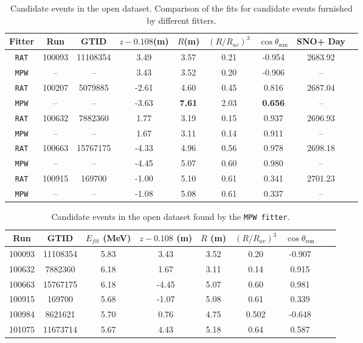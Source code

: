 \begin{table}[ht]
	\centering
	\caption[Candidate events in the open dataset.]{Candidate events in the open dataset. Comparison of the fits for candidate events furnished by different fitters.	\label{tab:opendataCompare}}
	\begin{tabular*}{150mm}{c@{\extracolsep{\fill}}cccccccc}
		\toprule
		Fitter &	Run &  GTID &  $z-0.108$(m) & $R$(m)& $(R/R_{av})^3$ & $\cos\theta_\mathrm{sun}$ & SNO+ Day\\
		\hline 
		\texttt{RAT} & 100093 &11108354 &3.49 &3.57 &0.21 &-0.954 &2683.92 \\	
		\texttt{MPW} &  --& --& 3.43 &	3.52 &	0.20	& -0.906 & --\\
		\texttt{RAT} &	100207 &5079885 &-2.61 &4.60 &0.45 &0.816 &2687.04\\
		\texttt{MPW} &	 --& --& -3.63 & \textbf{7.61} &	2.03 & \textbf{0.656} & -- \\
		\texttt{RAT} &100632 &7882360 &1.77 &3.19 &0.15 &0.937 &2696.93\\
		\texttt{MPW} &    --& --&  1.67 & 3.11 &	0.14 & 0.911 & -- \\
		\texttt{RAT} &100663 &15767175 &-4.33& 4.96 &0.56 &0.978 &2698.18\\
		\texttt{MPW} & --& -- &-4.45 &	5.07 &	0.60 &	0.980 & -- \\
		\texttt{RAT} &100915 &169700 &-1.00 &5.10 &0.61 &0.341 &2701.23\\
		\texttt{MPW} &	--& --& -1.08 &	5.08 &	0.61 &	0.337 & -- \\	
		\bottomrule
	\end{tabular*}
\end{table}

\begin{table}[ht]
	\centering
	\caption{Candidate events in the open dataset found by the \texttt{MPW fitter}.	\label{tab:opendataMPW}}
	\begin{tabular*}{145mm}{c@{\extracolsep{\fill}}cccccccc}
		\toprule
		Run & GTID & $E_{fit}$ (MeV) & $z-0.108$ (m) & $R$ (m)& $(R/R_{av})^3$ & $\cos\theta_\mathrm{sun}$\\
		\hline 
		100093 &	11108354	&5.83 & 3.43 & 3.52 & 0.20 & -0.907\\
		100632&	7882360    &6.18& 1.67 &3.11 &0.14 &0.915\\
		100663&	15767175   &	6.18 & -4.45 &5.07 &0.60&	0.981\\
		100915&	169700   &	5.68 &	-1.07 &5.08 &0.61&0.339\\
		100984&	8621621&	5.70 & 0.76 &4.75 &0.502&-0.648\\
		101075&	11673714&	5.67 &4.43 &5.18 &0.64& 0.587\\
		\bottomrule
	\end{tabular*}
\end{table}

